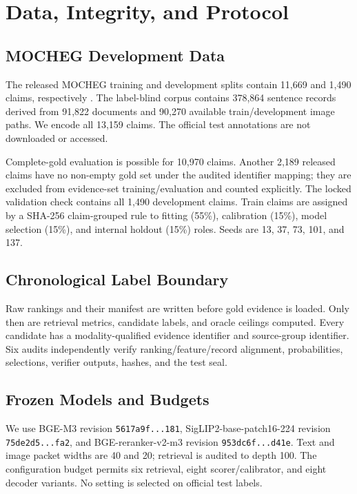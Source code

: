 \section{Data, Integrity, and Protocol}

\subsection{MOCHEG Development Data}

The released MOCHEG training and development splits contain 11,669 and 1,490 claims, respectively \cite{yao2023mocheg}. The label-blind corpus contains 378,864 sentence records derived from 91,822 documents and 90,270 available train/development image paths. We encode all 13,159 claims. The official test annotations are not downloaded or accessed.

Complete-gold evaluation is possible for 10,970 claims. Another 2,189 released claims have no non-empty gold set under the audited identifier mapping; they are excluded from evidence-set training/evaluation and counted explicitly. The locked validation check contains all 1,490 development claims. Train claims are assigned by a SHA-256 claim-grouped rule to fitting (55\%), calibration (15\%), model selection (15\%), and internal holdout (15\%) roles. Seeds are 13, 37, 73, 101, and 137.

\subsection{Chronological Label Boundary}

Raw rankings and their manifest are written before gold evidence is loaded. Only then are retrieval metrics, candidate labels, and oracle ceilings computed. Every candidate has a modality-qualified evidence identifier and source-group identifier. Six audits independently verify ranking/feature/record alignment, probabilities, selections, verifier outputs, hashes, and the test seal.

\subsection{Frozen Models and Budgets}

We use BGE-M3 revision \texttt{5617a9f...181}, SigLIP2-base-patch16-224 revision \texttt{75de2d5...fa2}, and BGE-reranker-v2-m3 revision \texttt{953dc6f...d41e}. Text and image packet widths are 40 and 20; retrieval is audited to depth 100. The configuration budget permits six retrieval, eight scorer/calibrator, and eight decoder variants. No setting is selected on official test labels.

